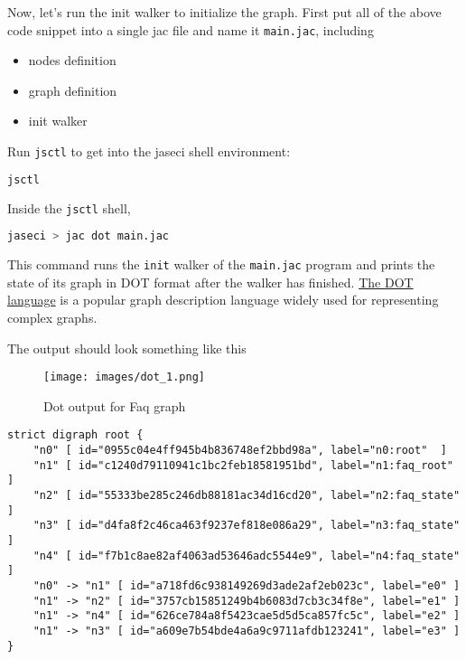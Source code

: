 Now, let's run the init walker to initialize the graph. First put all of
the above code snippet into a single jac file and name it
\passthrough{\lstinline!main.jac!}, including

\begin{itemize}
\tightlist
\item
  nodes definition
\item
  graph definition
\item
  init walker
\end{itemize}

Run \passthrough{\lstinline!jsctl!} to get into the jaseci shell
environment:

\begin{lstlisting}[language=bash]
jsctl
\end{lstlisting}

Inside the \passthrough{\lstinline!jsctl!} shell,

\begin{lstlisting}[language=bash]
jaseci > jac dot main.jac
\end{lstlisting}

This command runs the \passthrough{\lstinline!init!} walker of the
\passthrough{\lstinline!main.jac!} program and prints the state of its
graph in DOT format after the walker has finished.
\href{https://graphviz.org/doc/info/lang.html}{The DOT language} is a
popular graph description language widely used for representing complex
graphs.

The output should look something like this

\begin{figure}
\centering
\texttt{[image: images/dot\_1.png]}
\caption{Dot output for Faq graph}
\end{figure}

\begin{lstlisting}
strict digraph root {
    "n0" [ id="0955c04e4ff945b4b836748ef2bbd98a", label="n0:root"  ]
    "n1" [ id="c1240d79110941c1bc2feb18581951bd", label="n1:faq_root"  ]
    "n2" [ id="55333be285c246db88181ac34d16cd20", label="n2:faq_state"  ]
    "n3" [ id="d4fa8f2c46ca463f9237ef818e086a29", label="n3:faq_state"  ]
    "n4" [ id="f7b1c8ae82af4063ad53646adc5544e9", label="n4:faq_state"  ]
    "n0" -> "n1" [ id="a718fd6c938149269d3ade2af2eb023c", label="e0" ]
    "n1" -> "n2" [ id="3757cb15851249b4b6083d7cb3c34f8e", label="e1" ]
    "n1" -> "n4" [ id="626ce784a8f5423cae5d5d5ca857fc5c", label="e2" ]
    "n1" -> "n3" [ id="a609e7b54bde4a6a9c9711afdb123241", label="e3" ]
}
\end{lstlisting}

